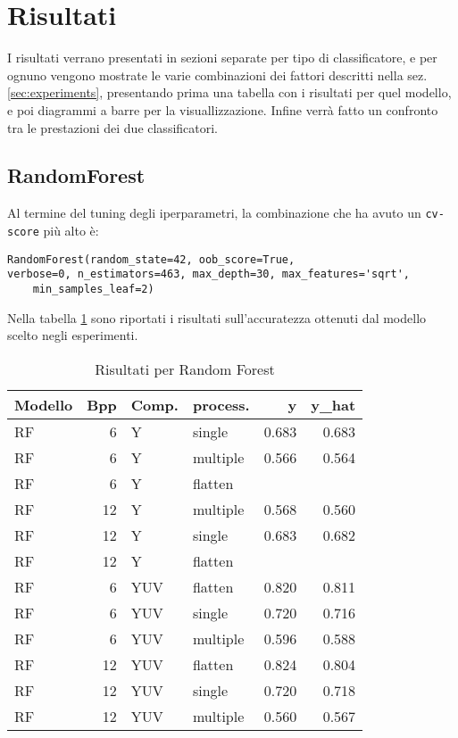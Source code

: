 \section{Risultati}
I risultati verrano presentati in sezioni separate per tipo di classificatore, e per ognuno vengono mostrate le varie combinazioni dei fattori descritti nella sez. \ref{sec:experiments}, presentando prima una tabella con i risultati per quel modello, e poi diagrammi a barre per la visuallizzazione.
Infine verrà fatto un confronto tra le prestazioni dei due classificatori.
\subsection{RandomForest}
Al termine del tuning degli iperparametri, la combinazione che ha avuto un \texttt{cv-score} più alto è:
\begin{lstlisting}[style=pythonElegant, caption={Miglior combinazione di parametri per RandomForestClassifier} ]
RandomForest(random_state=42, oob_score=True,
verbose=0, n_estimators=463, max_depth=30, max_features='sqrt',
    min_samples_leaf=2)
\end{lstlisting}
Nella tabella \ref{tab:RF-results-table} sono riportati i risultati sull'accuratezza ottenuti dal modello scelto negli esperimenti. 
\begin{table}[H]
\centering
\caption{Risultati per Random Forest}\label{tab:RF-results-table}
\begin{tabular}{lrllrr}
\toprule
Modello &  Bpp &  Comp. &     process. &     y &  y\_hat \\
\midrule
RF &  6 &       Y &   single & 0.683 &  0.683 \\
RF &  6 &       Y & multiple & 0.566 &  0.564 \\
RF &  6 &       Y & flatten &  &   \\
RF & 12 &       Y & multiple & 0.568 &  0.560 \\
RF & 12 &       Y &   single & 0.683 &  0.682 \\
RF &  12 &       Y & flatten &  &   \\

\midrule
RF &  6 &     YUV &  flatten & 0.820 &  0.811 \\
RF &  6 &     YUV &   single & 0.720 &  0.716 \\
RF &  6 &     YUV & multiple & 0.596 &  0.588 \\
RF & 12 &     YUV &  flatten & 0.824 &  0.804 \\
RF & 12 &     YUV &   single & 0.720 &  0.718 \\
RF & 12 &     YUV & multiple & 0.560 &  0.567 \\
\bottomrule
\end{tabular}
\end{table}
